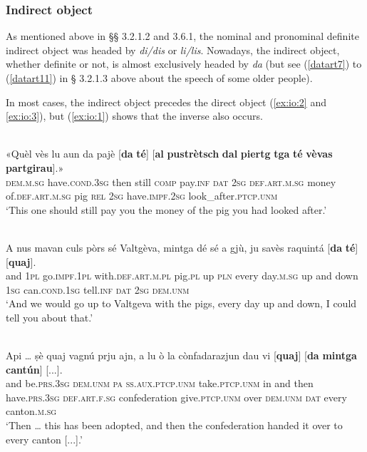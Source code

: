 \subsubsection{Indirect object}
As mentioned above in §§ 3.2.1.2 and 3.6.1, the nominal and pronominal definite indirect object was headed by \textit{di/dis} or \textit{li/lis}. Nowadays, the indirect object, whether definite or not, is almost exclusively headed by \textit{da} (but see (\ref{datart7}) to (\ref{datart11}) in § 3.2.1.3 above about the speech of some older people).

In most cases, the indirect object precedes the direct object (\ref{ex:io:2} and \ref{ex:io:3}), but (\ref{ex:io:1}) shows that the inverse also occurs.
 
\ea\label{ex:io:2}
\\
\gll  «Quèl vès lu aun da pajè [\textbf{da} \textbf{té}] [\textbf{al} \textbf{pustrètsch} \textbf{dal} \textbf{piertg} \textbf{tga} \textbf{té} \textbf{vèvas} \textbf{partgirau}].» \\
\textsc{dem.m.sg} have.\textsc{cond.3sg} then still \textsc{comp} pay.\textsc{inf} \textsc{dat} \textsc{2sg} \textsc{def.art.m.sg} money of.\textsc{def.art.m.sg} pig \textsc{rel} \textsc{2sg} have.\textsc{impf.2sg} look\_after.\textsc{ptcp.unm}\\
\glt `This one should still pay you the money of the pig you had looked after.'
\z

\ea
\label{ex:io:3}
\\
\gll    A nus mavan culs pòrs sé Valtgèva, mintga dé sé a gjù, ju savès raquintá [\textbf{da} \textbf{té}] [\textbf{quaj}].\\
and \textsc{1pl}  go.\textsc{impf.1pl} with.\textsc{def.art.m.pl} pig.\textsc{pl} up \textsc{pln} every day.\textsc{m.sg} up and down  \textsc{1sg}  can.\textsc{cond.1sg}  tell.\textsc{inf}  \textsc{dat}  \textsc{2sg} \textsc{dem.unm}\\
\glt `And we would go up to Valtgeva with the pigs, every day up and down, I could tell you about that.'
\z

\ea\label{ex:io:1}
\\
\gll Api … ṣè quaj vagnú prju ajn, a lu ò la cònfadarazjun dau vi [\textbf{quaj}] [\textbf{da} \textbf{mintga} \textbf{cantún}] [...].   \\
and {} be.\textsc{prs.3sg} \textsc{dem.unm} \textsc{pa ss.aux.ptcp.unm} take.\textsc{ptcp.unm} in and then have.\textsc{prs.3sg} \textsc{def.art.f.sg} confederation give.\textsc{ptcp.unm} over \textsc{dem.unm} \textsc{dat} every canton.\textsc{m.sg}\\
\glt `Then … this has been adopted, and then the confederation handed it over to every canton [...].'
\z

